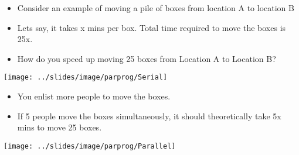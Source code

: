 \documentclass[10pt,t]{beamer}
\begin{document}
\begin{frame}
  \vspace{1cm}
  \begin{itemize}
  \item Consider an example of moving a pile of boxes from location A to location B
  \item Lets say, it takes x mins per box. Total time required to move the boxes is 25x.
  \item How do you speed up moving 25 boxes from Location A to Location B?
  \end{itemize}
  \texttt{[image: ../slides/image/parprog/Serial]}
\end{frame}

\begin{frame}
  \vspace{1cm}
  \begin{itemize}
  \item You enlist more people to move the boxes.
  \item If 5 people move the boxes simultaneously, it should theoretically take 5x mins to move 25 boxes.
  \end{itemize}
  \vspace{-0.9cm}
  \begin{center}
    \texttt{[image: ../slides/image/parprog/Parallel]}
    \vspace{-0.8cm}
  \end{center}
\end{frame}
\end{document}
